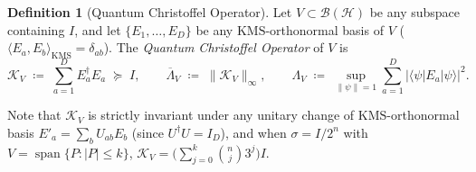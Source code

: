 \documentclass[11pt,a4paper]{article}
\theoremstyle{definition}
\newtheorem{definition}{Definition}[section]
\newcommand{\KMS}{\mathrm{KMS}}
\newcommand{\Kchr}{\mathcal{K}}
\begin{document}
\begin{definition}[Quantum Christoffel Operator]
\label{def:christoffel}
Let $V \subset \mathcal{B}(\mathcal{H})$ be any subspace containing $I$, and let $\{E_1, \dots, E_D\}$ be any $\KMS$-orthonormal basis of $V$ ($\langle E_a, E_b \rangle_{\KMS} = \delta_{ab}$). The \emph{Quantum Christoffel Operator} of $V$ is
\[
  \Kchr_V \;\coloneqq\; \sum_{a=1}^D E_a^\dagger E_a \;\succeq\; I,
  \qquad
  \overline{\Lambda}_V \;\coloneqq\; \|\Kchr_V\|_\infty,
  \qquad
  \Lambda_V \;\coloneqq\; \sup_{\|\psi\|=1} \sum_{a=1}^D \bigl|\langle \psi | E_a | \psi \rangle\bigr|^2.
\]
\end{definition}

Note that $\Kchr_V$ is strictly invariant under any unitary change of $\KMS$-orthonormal basis $E'_a = \sum_b U_{ab} E_b$ (since $U^\dagger U = I_D$), and when $\sigma = I/2^n$ with $V = \operatorname{span}\{P : |P| \le k\}$, $\Kchr_V = \bigl(\sum_{j=0}^k \binom{n}{j} 3^j\bigr) I$.
\end{document}
